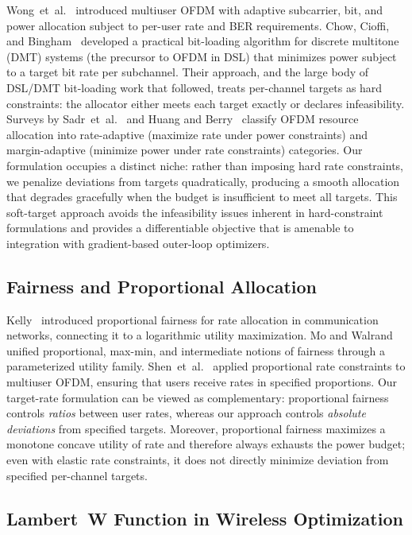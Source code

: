 \documentclass[journal]{IEEEtran}
\begin{document}
Wong~et~al.~\cite{wong1999multiuserofdm} introduced multiuser OFDM with adaptive subcarrier, bit, and power allocation subject to per-user rate and BER requirements.
Chow, Cioffi, and Bingham~\cite{chow1995dmt} developed a practical bit-loading algorithm for discrete multitone (DMT) systems (the precursor to OFDM in DSL) that minimizes power subject to a target bit rate per subchannel.
Their approach, and the large body of DSL/DMT bit-loading work that followed, treats per-channel targets as hard constraints: the allocator either meets each target exactly or declares infeasibility.
Surveys by Sadr~et~al.~\cite{sadr2009survey} and Huang and Berry~\cite{huangberry2009chapter} classify OFDM resource allocation into rate-adaptive (maximize rate under power constraints) and margin-adaptive (minimize power under rate constraints) categories.
Our formulation occupies a distinct niche: rather than imposing hard rate constraints, we penalize deviations from targets quadratically, producing a smooth allocation that degrades gracefully when the budget is insufficient to meet all targets.
This soft-target approach avoids the infeasibility issues inherent in hard-constraint formulations and provides a differentiable objective that is amenable to integration with gradient-based outer-loop optimizers.

\subsection{Fairness and Proportional Allocation}

Kelly~\cite{kelly1998rate} introduced proportional fairness for rate allocation in communication networks, connecting it to a logarithmic utility maximization.
Mo and Walrand~\cite{mo2000fair} unified proportional, max-min, and intermediate notions of fairness through a parameterized utility family.
Shen~et~al.~\cite{shen2005proportional} applied proportional rate constraints to multiuser OFDM, ensuring that users receive rates in specified proportions.
Our target-rate formulation can be viewed as complementary: proportional fairness controls \emph{ratios} between user rates, whereas our approach controls \emph{absolute deviations} from specified targets.
Moreover, proportional fairness maximizes a monotone concave utility of rate and therefore always exhausts the power budget; even with elastic rate constraints, it does not directly minimize deviation from specified per-channel targets.

\subsection{Lambert~W Function in Wireless Optimization}
\end{document}
